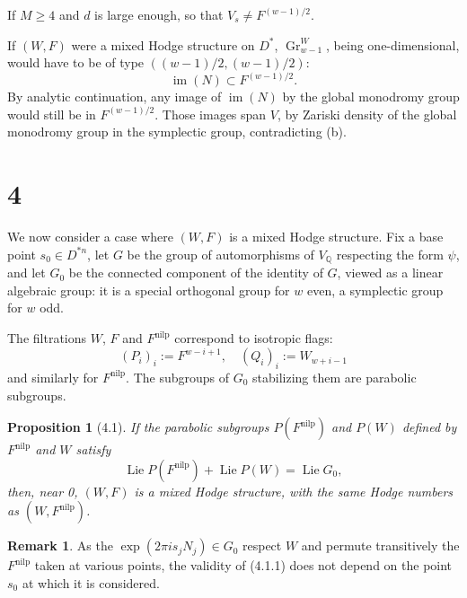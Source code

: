 \documentclass[11pt,a4paper]{article}
\theoremstyle{plain}
\newtheorem{proposition}[theorem]{Proposition}
\theoremstyle{definition}
\newtheorem{remark}[theorem]{Remark}
\DeclareMathOperator{\Gr}{Gr}
\DeclareMathOperator{\im}{im}
\DeclareMathOperator{\Lie}{Lie}
\begin{document}
If $M \geq 4$ and $d$ is large enough, so that $V_{s} \neq F^{(w-1)/2}$.

If $(W, F)$ were a mixed Hodge structure on $D^{*}$, $\Gr_{w-1}^{W}$, being one-dimensional, would have to be of type $((w-1)/2, (w-1)/2)$:
\[
\im(N) \subset F^{(w-1)/2}.
\]
By analytic continuation, any image of $\im(N)$ by the global monodromy group would still be in $F^{(w-1)/2}$. Those images span $V$, by Zariski density of the global monodromy group in the symplectic group, contradicting (b).

\section{4}

We now consider a case where $(W, F)$ is a mixed Hodge structure. Fix a base point $s_{0} \in D^{*n}$, let $G$ be the group of automorphisms of $V_{\mathbb{Q}}$ respecting the form $\psi$, and let $G_{0}$ be the connected component of the identity of $G$, viewed as a linear algebraic group: it is a special orthogonal group for $w$ even, a symplectic group for $w$ odd.

The filtrations $W$, $F$ and $F^{\text{nilp}}$ correspond to isotropic flags:
\[
(P_{i})_{i} := F^{w-i+1}, \quad (Q_{i})_{i} := W_{w+i-1}
\]
and similarly for $F^{\text{nilp}}$. The subgroups of $G_{0}$ stabilizing them are parabolic subgroups.

\begin{proposition}[4.1]
If the parabolic subgroups $P(F^{\text{nilp}})$ and $P(W)$ defined by $F^{\text{nilp}}$ and $W$ satisfy
\begin{equation}
\Lie P(F^{\text{nilp}}) + \Lie P(W) = \Lie G_{0}, \tag{4.1.1}
\end{equation}
then, near 0, $(W, F)$ is a mixed Hodge structure, with the same Hodge numbers as $(W, F^{\text{nilp}})$.
\end{proposition}

\begin{remark}
As the $\exp(2\pi is_{j}N_{j}) \in G_{0}$ respect $W$ and permute transitively the $F^{\text{nilp}}$ taken at various points, the validity of (4.1.1) does not depend on the point $s_{0}$ at which it is considered.
\end{remark}
\end{document}
